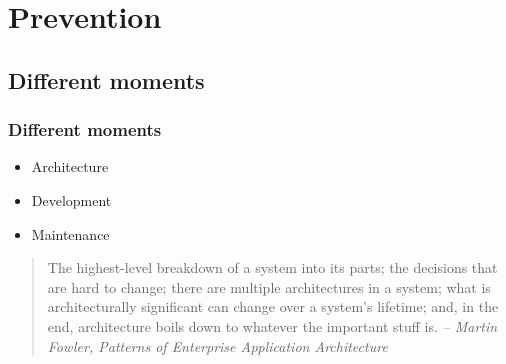 \section{Prevention}

\subsection{Different moments}

\begin{frame}
\frametitle{Different moments}

\begin{itemize}
\Huge
\item Architecture
\item Development
\item Maintenance
\normalsize
\end{itemize}
\end{frame}

\begin{frame}
\begin{quote}
The highest-level breakdown of a system into its parts; the decisions that are
hard to change; there are multiple architectures in a system; what is
architecturally significant can change over a system's lifetime; and, in the
end, architecture boils down to whatever the {\Large important stuff} is.
\textit{-- Martin Fowler, Patterns of Enterprise Application Architecture}
\end{quote}
\end{frame}

